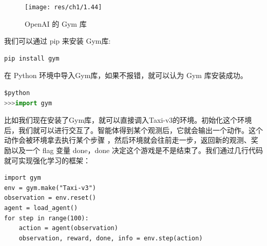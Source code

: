\begin{figure}[htb]
    \centering
    \texttt{[image: res/ch1/1.44]}
    \caption{OpenAI 的 Gym 库}
    \label{fig:fig1.44}
\end{figure}

我们可以通过 pip 来安装 Gym库:


\begin{lstlisting}[language=sh,basicstyle=\zihao{-5}\ttfamily]
pip install gym
\end{lstlisting}


在 Python 环境中导入Gym库，如果不报错，就可以认为 Gym 库安装成功。


\begin{lstlisting}[language=Python,basicstyle=\zihao{-5}\ttfamily,stringstyle=\color{blue}]
$python
>>>import gym
\end{lstlisting}




比如我们现在安装了Gym库，就可以直接调入Taxi-v3的环境。初始化这个环境后，我们就可以进行交互了。智能体得到某个观测后，它就会输出一个动作。这个动作会被环境拿去执行某个步骤 ，然后环境就会往前走一步，返回新的观测、奖励以及一个 flag 变量 done，done 决定这个游戏是不是结束了。我们通过几行代码就可实现强化学习的框架：

\begin{lstlisting}[style=Python]
import gym 
env = gym.make("Taxi-v3") 
observation = env.reset() 
agent = load_agent() 
for step in range(100):
    action = agent(observation) 
    observation, reward, done, info = env.step(action)
\end{lstlisting}

